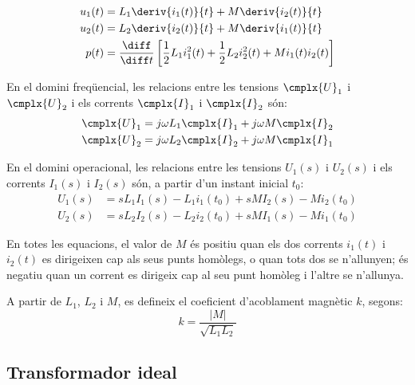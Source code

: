 \hfill
\begin{minipage}[b]{6.5cm}
	
	\label{pic:acobl}
\end{minipage}
\hfill
\begin{minipage}[b][3.8cm][t]{10cm}
	\begin{align}
		u_1(t) &= L_1 \deriv{i_1(t)}{t} + M \deriv{i_2(t)}{t} \\
		u_2(t) &= L_2 \deriv{i_2(t)}{t} + M \deriv{i_1(t)}{t} \\
		p(t) &= \frac{\diff}{\diff t} \left[ \frac{1}{2} L_1 i_1^2(t) + \frac{1}{2} L_2 i_2^2(t) +
		M i_1(t) i_2(t) \right]
	\end{align}
\end{minipage}


En el domini freqüencial, les relacions entre les tensions $\cmplx{U}_1$ i $\cmplx{U}_2$ i els corrents $\cmplx{I}_1$ i $\cmplx{I}_2$ són:
\begin{align}
	\cmplx{U}_1 &= j \omega L_1 \cmplx{I}_1 + j \omega M \cmplx{I}_2 \\
	\cmplx{U}_2 &= j \omega L_2 \cmplx{I}_2 + j \omega M \cmplx{I}_1
\end{align}

En el domini operacional, les relacions entre les tensions $U_1(s)$  i $U_2(s)$ i els corrents $I_1(s)$ i $I_2(s)$ són, a partir d'un instant inicial $t_0$:
\begin{align}
	U_1(s) &= s L_1 I_1(s) - L_1 i_1(t_0) + s M I_2(s) - M i_2(t_0) \\
	U_2(s) &= s L_2 I_2(s) - L_2 i_2(t_0) + s M I_1(s) - M i_1(t_0)
\end{align}

En totes les equacions, el valor de $M$ és positiu quan els dos corrents $i_1(t)$ i $i_2(t)$ es dirigeixen cap als seus punts homòlegs, o quan tots dos  se n'allunyen; és negatiu quan un corrent es dirigeix cap al seu punt homòleg i l'altre se n'allunya.

A partir de $L_1$, $L_2$ i $M$, es defineix el coeficient d'acoblament magnètic $k$, segons:
\begin{equation}
	k = \frac{|M|}{\sqrt{L_1 L_2}}
\end{equation}

\subsection{Transformador ideal} 

